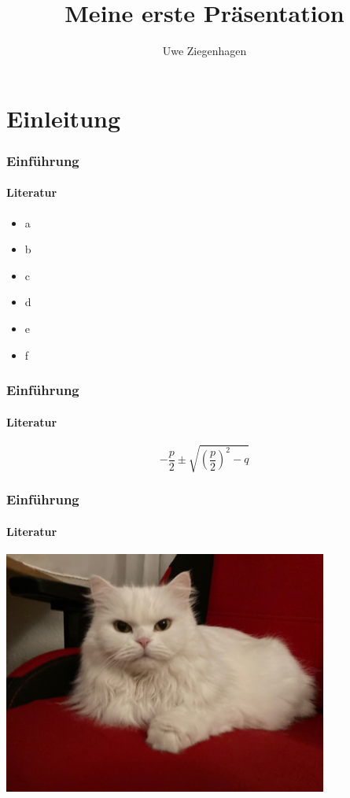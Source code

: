 \documentclass[ngerman]{beamer}
\author{Uwe Ziegenhagen}
\title{Meine erste Präsentation}
\institute{DANTE e.V. Heidelberg}
\begin{document}
\begin{frame}

\maketitle


\end{frame}

\begin{frame}

\tableofcontents

\end{frame}



\section{Einleitung}

\begin{frame}
\frametitle{Einführung}
\framesubtitle{Literatur}

\begin{itemize}
	\item a
	\item b
	\item c
	\item d
	\item e
	\item f
\end{itemize}

\end{frame}

\begin{frame}
\frametitle{Einführung}
\framesubtitle{Literatur}


{\huge
\begin{equation}
-\frac{p}{2} \pm \sqrt{ \left( \frac{p}{2} \right)^2 - q }
\end{equation}}

\end{frame}

\begin{frame}
\frametitle{Einführung}
\framesubtitle{Literatur}

\begin{center}
\includegraphics[width=0.8\textwidth]{Bilder/Katze2}
\end{center}

\end{frame}
\end{document}
